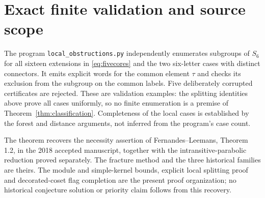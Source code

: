 \section*{Exact finite validation and source scope}
The program \texttt{local\_obstructions.py} independently enumerates
subgroups of $S_6$ for all sixteen extensions in \eqref{eq:fivecores} and the two
six-letter cases with distinct connectors. It emits explicit words
for the common element $\tau$ and checks its exclusion from the
subgroup on the common labels. Five deliberately corrupted certificates
are rejected. These are validation examples: the splitting identities
above prove all cases uniformly, so no finite enumeration is a premise
of Theorem~\ref{thm:classification}. Completeness of the local cases
is established by the forest and distance arguments, not inferred from
the program's case count.

The theorem recovers the necessity assertion of Fernandes--Leemans,
Theorem 1.2, in the 2018 accepted manuscript, together with the
intransitive-parabolic reduction proved separately. The fracture method
and the three historical families are theirs. The module and simple-kernel bounds,
explicit local splitting proof and decorated-coset flag completion are
the present proof organization; no historical conjecture solution or
priority claim follows from this recovery.
